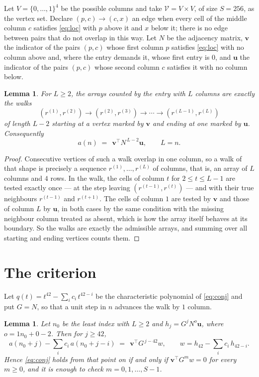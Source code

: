 \documentclass[11pt,a4paper]{article}
\theoremstyle{plain}
\newtheorem{lemma}[theorem]{Lemma}
\theoremstyle{definition}
\begin{document}
Let $V=\{0,\dots,1\}^{4}$ be the possible columns and take
$\mathcal V=V\times V$, of size $S=256$, as the vertex set. Declare $(p,c)\to(c,x)$ an edge
when every cell of the middle column $c$ satisfies \eqref{eq:loc} with $p$ above it and $x$
below it; there is no edge between pairs that do not overlap in this way. Let $N$ be the
adjacency matrix, $\mathbf{v}$ the indicator of the pairs $(p,c)$ whose first column $p$
satisfies \eqref{eq:loc} with no column above and, where the entry demands it, whose first entry is $0$, and $\mathbf{u}$ the indicator of
the pairs $(p,c)$ whose second column $c$ satisfies it with no column below.

\begin{lemma}\label{lem:walk}
For $L\ge2$, the arrays counted by the entry with $L$ columns are exactly the walks
\[
(r^{(1)},r^{(2)})\to(r^{(2)},r^{(3)})\to\cdots\to(r^{(L-1)},r^{(L)})
\]
of length $L-2$ starting at a vertex marked by $\mathbf{v}$ and ending at one marked by
$\mathbf{u}$. Consequently
\[
a(n)\;=\;\,\mathbf{v}^{\!\top}N^{\,L-2}\mathbf{u},\qquad L=n .
\]
\end{lemma}

\begin{proof}
Consecutive vertices of such a walk overlap in one column, so a walk of that shape is
precisely a sequence $r^{(1)},\dots,r^{(L)}$ of columns, that is, an array of $L$ columns
and $4$ rows. In the walk, the cells of column $t$ for $2\le t\le L-1$ are tested
exactly once --- at the step leaving $(r^{(t-1)},r^{(t)})$ --- and with their true
neighbours $r^{(t-1)}$ and $r^{(t+1)}$. The cells of column $1$ are tested by
$\mathbf{v}$ and those of column $L$ by $\mathbf{u}$, in both cases by the same condition
with the missing neighbour column treated as absent, which is how the array itself behaves at
its boundary. So the walks are exactly the admissible arrays, and summing over all starting
and ending vertices counts them.
\end{proof}

\section{The criterion}

Let $q(t)=t^{42}-\sum_i c_i\,t^{42-i}$ be the characteristic polynomial of
\eqref{eq:conj} and put $G=N$, so that a unit step in $n$ advances the walk by
$1$ column.

\begin{lemma}\label{lem:crit}
Let $n_0$ be the least index with $L\ge2$ and $h_j=G^{j}N^{o}\mathbf{u}$, where
$o=1n_0+0-2$. Then for $j\ge42$,
\[
a(n_0+j)-\sum_i c_i\,a(n_0+j-i)\;=\;\,\mathbf{v}^{\!\top}G^{\,j-42}w,
\qquad w=h_{42}-\sum_i c_i\,h_{42-i} .
\]
Hence \eqref{eq:conj} holds from that point on if and only if
$\mathbf{v}^{\!\top}G^{m}w=0$ for every $m\ge0$, and it is enough to check
$m=0,1,\dots,S-1$.
\end{lemma}
\end{document}
